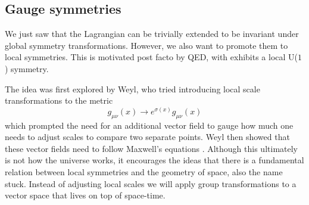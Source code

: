 \subsection{Gauge symmetries}

We just saw that the Lagrangian can be trivially extended to be invariant under
global symmetry transformations. However, we also want to promote them to local
symmetries. This is motivated post facto by QED, with exhibits a local U($1$)
symmetry.

The idea was first explored by Weyl, who tried introducing local scale
transformations to the metric
%
\begin{equation}
  g_{\mu\nu}(x) \to e^{\sigma(x)}g_{\mu\nu}(x)
\end{equation}
%
which prompted the need for an additional vector field to gauge how much one
needs to adjust scales to compare two separate points. Weyl then showed that
these vector fields need to follow Maxwell's equations \citep{Weyl:1918ib}.
Although this ultimately is not how the universe works, it encourages the ideas
that there is a fundamental relation between local symmetries and the geometry
of space, also the name stuck. Instead of adjusting local scales we will apply
group transformations to a vector space that lives on top of space-time.


